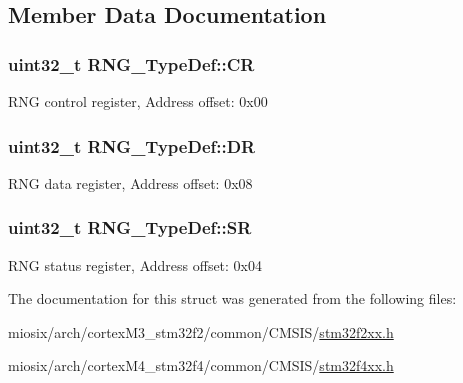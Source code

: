 \subsection{Member Data Documentation}
\hypertarget{struct_r_n_g___type_def_ab422a7aeea33d29d0f8b841bb461e3a8}{
\subsubsection[{C\-R}]{ uint32\-\_\-t R\-N\-G\-\_\-\-Type\-Def\-::\-C\-R}}\label{struct_r_n_g___type_def_ab422a7aeea33d29d0f8b841bb461e3a8}
R\-N\-G control register, Address offset\-: 0x00 \hypertarget{struct_r_n_g___type_def_a89f3352fb11cca430aaecc0c9b49c6d3}{
\subsubsection[{D\-R}]{ uint32\-\_\-t R\-N\-G\-\_\-\-Type\-Def\-::\-D\-R}}\label{struct_r_n_g___type_def_a89f3352fb11cca430aaecc0c9b49c6d3}
R\-N\-G data register, Address offset\-: 0x08 \hypertarget{struct_r_n_g___type_def_a4e4c38cd6a078fea5f9fa5e31bc0d326}{
\subsubsection[{S\-R}]{ uint32\-\_\-t R\-N\-G\-\_\-\-Type\-Def\-::\-S\-R}}\label{struct_r_n_g___type_def_a4e4c38cd6a078fea5f9fa5e31bc0d326}
R\-N\-G status register, Address offset\-: 0x04 

The documentation for this struct was generated from the following files\-:\begin{DoxyCompactItemize}
\item 
miosix/arch/cortex\-M3\-\_\-stm32f2/common/\-C\-M\-S\-I\-S/\hyperlink{stm32f2xx_8h}{stm32f2xx.\-h}\item 
miosix/arch/cortex\-M4\-\_\-stm32f4/common/\-C\-M\-S\-I\-S/\hyperlink{stm32f4xx_8h}{stm32f4xx.\-h}\end{DoxyCompactItemize}

